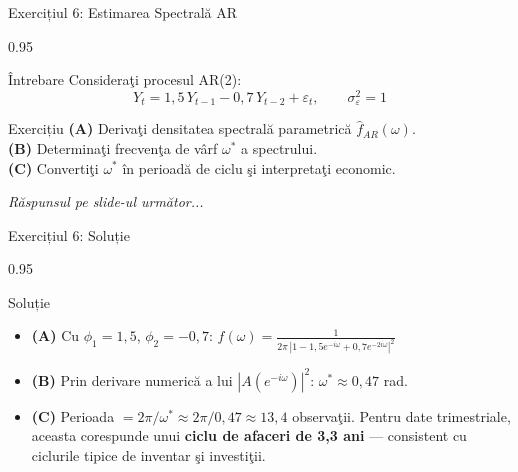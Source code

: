 \documentclass[9pt, aspectratio=169, t]{beamer}
\begin{document}
\begin{frame}{Exercițiul 6: Estimarea Spectrală AR}
    \begin{cminipage}{0.95\textwidth}
    \begin{alertblock}{Întrebare}
        Consideraţi procesul AR(2):
        \[
            Y_t = 1{,}5\,Y_{t-1} - 0{,}7\,Y_{t-2} + \varepsilon_t, \qquad \sigma^2_\varepsilon = 1
        \]
    \end{alertblock}

    \vspace{0.2cm}

    \begin{block}{Exercițiu}
        \textcolor{MainBlue}{\textbf{(A)}} Derivaţi densitatea spectrală parametrică $\hat{f}_{AR}(\omega)$.\\[3pt]
        \textcolor{MainBlue}{\textbf{(B)}} Determinaţi frecvenţa de vârf $\omega^*$ a spectrului.\\[3pt]
        \textcolor{MainBlue}{\textbf{(C)}} Convertiţi $\omega^*$ în perioadă de ciclu şi interpretaţi economic.
    \end{block}

    \vspace{0.3cm}

    \begin{center}
        \textit{Răspunsul pe slide-ul următor...}
    \end{center}
    \end{cminipage}
\end{frame}

\begin{frame}{Exercițiul 6: Soluție}
    \begin{cminipage}{0.95\textwidth}
    \begin{exampleblock}{Soluție}
        {\small
        \begin{itemize}\setlength{\itemsep}{0pt}
            \item \textcolor{MainBlue}{\textbf{(A)}} Cu $\phi_1 = 1{,}5$, $\phi_2 = -0{,}7$:
            $f(\omega) = \frac{1}{2\pi\,|1 - 1{,}5e^{-i\omega} + 0{,}7e^{-2i\omega}|^2}$
            \item \textcolor{MainBlue}{\textbf{(B)}} Prin derivare numerică a lui $|A(e^{-i\omega})|^2$: $\omega^* \approx 0{,}47$ rad.
            \item \textcolor{MainBlue}{\textbf{(C)}} Perioada $= 2\pi/\omega^* \approx 2\pi/0{,}47 \approx 13{,}4$ observaţii. Pentru date trimestriale, aceasta corespunde unui \textbf{ciclu de afaceri de 3,3 ani} --- consistent cu ciclurile tipice de inventar şi investiţii.
        \end{itemize}
        }
    \end{exampleblock}
    \end{cminipage}
\end{frame}
\end{document}
